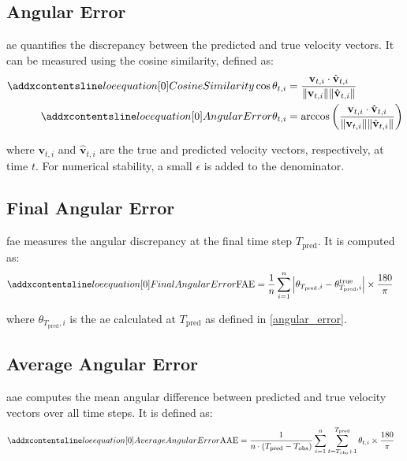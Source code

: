 \subsection*{Angular Error}
\label{eq:angular error}
\gls{ae} quantifies the discrepancy between the predicted and true velocity vectors. It can be measured using the cosine similarity, defined as:
\begin{align}
\setequationentry{Cosine Similarity}
    \cos \theta_{t,i} &= \frac{\mathbf{v}_{t,i} \cdot \hat{\mathbf{v}}_{t,i}}{\|\mathbf{v}_{t,i}\| \|\hat{\mathbf{v}}_{t,i}\|} \\
\setequationentry{Angular Error}
\label{angular_error}
    \theta_{t,i} &= \text{arccos} \left( \frac{\mathbf{v}_{t,i} \cdot \hat{\mathbf{v}}_{t,i}}{\|\mathbf{v}_{t,i}\| \|\hat{\mathbf{v}}_{t,i}\|} \right)
\end{align}

where \(\mathbf{v}_{t,i}\) and \(\hat{\mathbf{v}}_{t,i}\) are the true and predicted velocity vectors, respectively, at time \(t\). For numerical stability, a small \(\epsilon\) is added to the denominator.


\subsection{Final Angular Error}
\label{eq:fae}
\gls{fae} measures the angular discrepancy at the final time step \(T_{\text{pred}}\). It is computed as:
\begin{align}
\setequationentry{Final Angular Error}
    \text{FAE} &= \frac{1}{n} \sum_{i=1}^n \left| \theta_{T_{\text{pred}},i} - \theta_{T_{\text{pred}},i}^\text{true} \right| \times \frac{180}{\pi}
\end{align}

where \(\theta_{T_{\text{pred}},i}\) is the \gls{ae} calculated at \(T_{\text{pred}}\) as defined in \eqref{angular_error}.

\subsection{Average Angular Error}
\label{eq:aae}
\gls{aae} computes the mean angular difference between predicted and true velocity vectors over all time steps. It is defined as:
\begin{align}
\setequationentry{Average Angular Error}
    \text{AAE} &= \frac{1}{n \cdot (T_{\text{pred}} - T_{\text{obs}})} \sum_{i=1}^n \sum_{t=T_{\text{obs}}+1}^{T_{\text{pred}}} \theta_{t,i} \times \frac{180}{\pi}
\end{align}

